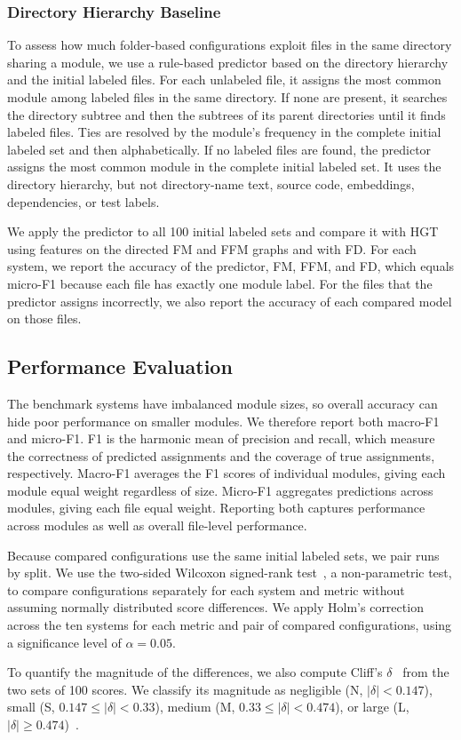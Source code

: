 \subsubsection{Directory Hierarchy Baseline\label{sec:dir_predictor}}
To assess how much folder-based configurations exploit files in the same directory sharing a module, we use a rule-based predictor based on the directory hierarchy and the initial labeled files. For each unlabeled file, it assigns the most common module among labeled files in the same directory. If none are present, it searches the directory subtree and then the subtrees of its parent directories until it finds labeled files. Ties are resolved by the module's frequency in the complete initial labeled set and then alphabetically. If no labeled files are found, the predictor assigns the most common module in the complete initial labeled set. It uses the directory hierarchy, but not directory-name text, source code, embeddings, dependencies, or test labels.

We apply the predictor to all 100 initial labeled sets and compare it with HGT using \ft{} features on the directed FM and FFM graphs and with FD. For each system, we report the accuracy of the predictor, FM, FFM, and FD, which equals micro-F1 because each file has exactly one module label. For the files that the predictor assigns incorrectly, we also report the accuracy of each compared model on those files.

\subsection{Performance Evaluation}
The benchmark systems have imbalanced module sizes, so overall accuracy can hide poor performance on smaller modules. We therefore report both macro-F1 and micro-F1. F1 is the harmonic mean of precision and recall, which measure the correctness of predicted assignments and the coverage of true assignments, respectively. Macro-F1 averages the F1 scores of individual modules, giving each module equal weight regardless of size. Micro-F1 aggregates predictions across modules, giving each file equal weight. Reporting both captures performance across modules as well as overall file-level performance.

Because compared configurations use the same initial labeled sets, we pair runs by split. We use the two-sided Wilcoxon signed-rank test~\cite{wilcoxon}, a non-parametric test, to compare configurations separately for each system and metric without assuming normally distributed score differences. We apply Holm's correction across the ten systems for each metric and pair of compared configurations, using a significance level of $\alpha=0.05$.

To quantify the magnitude of the differences, we also compute Cliff's $\delta$~\cite{cliff} from the two sets of 100 scores. We classify its magnitude as negligible (N, $|\delta|<0.147$), small (S, $0.147\leq|\delta|<0.33$), medium (M, $0.33\leq|\delta|<0.474$), or large (L, $|\delta|\geq0.474$)~\cite{romano2006}.
